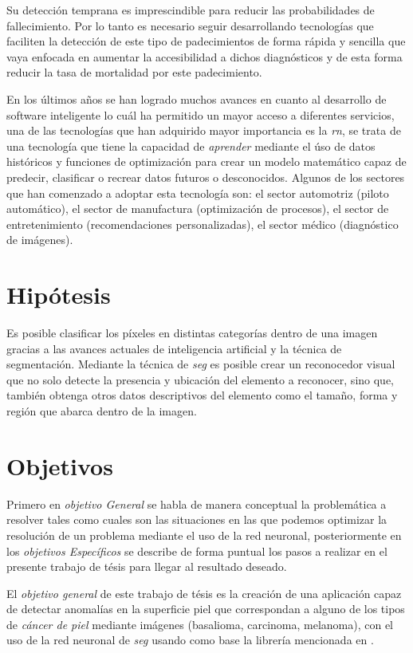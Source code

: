  Su detección temprana es imprescindible para reducir las probabilidades de fallecimiento. Por lo tanto es necesario seguir desarrollando tecnologías que faciliten la detección de este tipo de padecimientos de forma rápida y sencilla que vaya enfocada en aumentar la accesibilidad a dichos diagnósticos y de esta forma reducir la tasa de mortalidad por este padecimiento.

En los últimos años se han logrado muchos avances en cuanto al desarrollo de software inteligente lo cuál ha permitido un mayor acceso a diferentes servicios, una de las tecnologías que han adquirido mayor importancia es la \emph{\gls{rn}}, se trata de una tecnología que tiene la capacidad de \emph{aprender} mediante el úso de datos históricos y funciones de optimización para crear un modelo matemático capaz de predecir, clasificar o recrear datos futuros o desconocidos. Algunos de los sectores que han comenzado a adoptar esta tecnología son: el sector automotriz (piloto automático), el sector de manufactura (optimización de procesos), el sector de entretenimiento (recomendaciones personalizadas), el sector médico (diagnóstico de imágenes). 


\section{Hipótesis}
Es posible clasificar los píxeles en distintas categorías dentro de una imagen gracias a las avances actuales de inteligencia artificial y la técnica de segmentación. Mediante la técnica de \emph{\gls{seg}} es posible crear un reconocedor visual que no solo detecte la presencia y ubicación del elemento a reconocer, sino que, también obtenga otros datos descriptivos del elemento como el tamaño, forma y región que abarca dentro de la imagen.

\section{Objetivos}
Primero en \emph{objetivo General} se habla de manera conceptual la problemática a resolver tales como cuales son las situaciones en las que podemos optimizar la resolución de un problema mediante el uso de la red neuronal, posteriormente en los \emph{objetivos Específicos} se describe de forma puntual los pasos a realizar en el presente trabajo de tésis para llegar al resultado deseado.

El \emph{objetivo general} de este trabajo de tésis es la creación de una aplicación capaz de detectar anomalías en la superficie piel que correspondan a alguno de los tipos de \emph{cáncer de piel} mediante imágenes (basalioma, carcinoma, melanoma), con el uso de la red neuronal de \emph{\gls{seg}} usando como base la librería mencionada en \citet{wu2019fastfcn}. 


